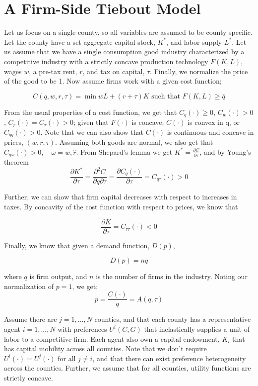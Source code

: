 \documentclass{article}
\begin{document}
\section{A Firm-Side Tiebout Model}

Let us focus on a single county, so all variables are assumed to be county specific. Let the county have a set aggregate capital stock, $K^{*}$, and labor supply $L^{*}$. Let us assume that we have a single consumption good industry characterized by a competitive industry with a strictly concave production technology $F(K,L)$, wages $w$, a pre-tax rent, $r$, and tax on capital, $\tau$. Finally, we normalize the price of the good to be 1. Now assume firms work with a given cost function;

$$C(q,w,r,\tau) = \min wL+(r+\tau)K \text{ such that } F(K,L) \geq \bar q$$

From the usual properties of a cost function, we get that $C_{q}(\cdot) \geq 0$, $C_{w}(\cdot) > 0$, $C_{r}(\cdot) = C_{\tau}(\cdot)> 0$; given that $F(\cdot)$ is concave; $C(\cdot)$ is convex in q, or $C_{qq}(\cdot) > 0$. Note that we can also show that $C(\cdot)$ is continuous and concave in prices, $(w,r, \tau)$. Assuming both goods are normal, we also get that $C_{q\omega}(\cdot) > 0, \quad \omega = w, \hat r$. From Shepard's lemma we get $K^{*} = \frac{\partial C}{\partial \tau}$, and by Young's theorem 
$$\frac{\partial K^{*}}{\partial \tau} = \frac{\partial^{2} C}{\partial q \partial \tau} = \frac{\partial C_{q}(\cdot)}{\partial \tau} = C_{q\tau}(\cdot) > 0 $$

Further, we can show that firm capital decreases with respect to increases in taxes. By concavity of the cost function with respect to prices, we know that

\begin{equation}
\frac{\partial K}{\partial \tau} = C_{\tau\tau}(\cdot) < 0
\end{equation}

Finally, we know that given a demand function, $D(p)$,

$$ D(p) = nq $$

where $q$ is firm output, and $n$ is the number of firms in the industry. Noting our normalization of $p = 1$, we get;
$$p = \frac{C(\cdot)}{q} = A(q,\tau)$$

Assume there are $j = 1,...,N$ counties, and that each county has a representative agent $i = 1,...,N$ with preferences $U^{i}(C,G)$ that inelastically supplies a unit of labor to a competitive firm. Each agent also own a capital endowment, $K_{i}$ that has capital mobility across all counties. Note that we don't require $U^{i}(\cdot) = U^{j}(\cdot)$ for all $j \neq i$, and that there can exist preference heterogeneity across the counties. Further, we assume that for all counties, utility functions are strictly concave.
\end{document}

